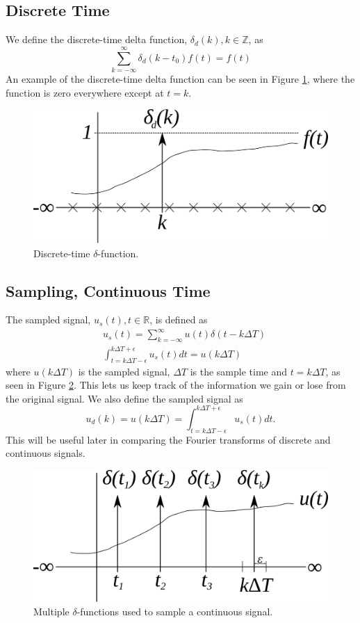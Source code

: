 \documentclass[lecture,12pt,]{pcms-l}
\theoremstyle{example}
\begin{document}
\subsection{Discrete Time}
We define the discrete-time delta function, $\delta_d(k), k \in \mathbb{Z}$, as
$$\sum_{k=-\infty}^\infty \delta_d(k-t_0)f(t) = f(t)$$
An example of the discrete-time delta function can be seen in Figure \ref{fig:02discDeltaFn}, where the function is zero everywhere except at $t=k$.
\begin{figure}[ht!]
	\centering
	\includegraphics[width=.7\textwidth]{images/02discDeltaFn}
	\caption{Discrete-time $\delta$-function.}
	\label{fig:02discDeltaFn}
\end{figure}

\subsection{Sampling, Continuous Time}
The sampled signal, $u_s(t), t \in \mathbb{R}$, is defined as
\begin{align*}
&u_s(t) = \sum_{k=-\infty}^\infty u(t)\delta(t-k\Delta T) \\
&\int_{t=k\Delta T-\epsilon}^{k\Delta T+\epsilon} u_s(t)dt = u(k\Delta T)
\end{align*}
where $u(k\Delta T)$ is the sampled signal, $\Delta T$ is the sample time and $t=k\Delta T$, as seen in Figure \ref{fig:02samplingDeltaFn}. This lets us keep track of the information we gain or lose from the original signal. We also define the sampled signal as
$$u_d(k) = u(k\Delta T) = \int_{t=k\Delta T-\epsilon}^{k\Delta T+\epsilon} u_s(t)dt.$$
This will be useful later in comparing the Fourier transforms of discrete and continuous signals.
\begin{figure}[ht!]
	\centering
	\includegraphics[width=.7\textwidth]{images/02samplingDeltaFn}
	\caption{Multiple $\delta$-functions used to sample a continuous signal.}
	\label{fig:02samplingDeltaFn}
\end{figure}
\end{document}
